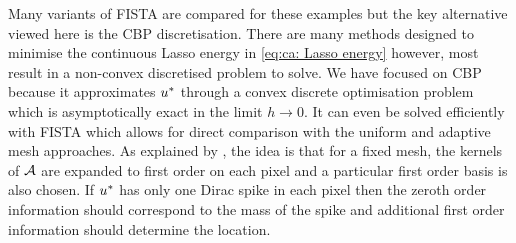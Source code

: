 \documentclass[10pt,a4paper,onecolumn]{article} \usepackage[latin1]{inputenc}
\numberwithin{equation}{section}
\newcommand*{\varf}[1]{%
	\IfEqCase{#1}{%
		{0}{u}%
		{1}{v}%
		{2}{w}%
	}[u#1]%
}
\newcommand{\meshsize}{h}
\begin{document}
Many variants of FISTA are compared for these examples but the key alternative viewed here is the CBP discretisation. There are many methods designed to minimise the continuous Lasso energy in \eqref{eq:ca: Lasso energy} \cite{Bredies2013,Castro2016,Boyd2017,Catala2019} however, most result in a non-convex discretised problem to solve. We have focused on CBP because it approximates $\varf0^*$ through a convex discrete optimisation problem which is asymptotically exact in the limit $\meshsize\to0$. It can even be solved efficiently with FISTA which allows for direct comparison with the uniform and adaptive mesh approaches. As explained by \cite{Ekanadham2011, Duval2017b}, the idea is that for a fixed mesh, the kernels of $\mathcal{A}$ are expanded to first order on each pixel and a particular first order basis is also chosen. If $\varf0^*$ has only one Dirac spike in each pixel then the zeroth order information should correspond to the mass of the spike and additional first order information should determine the location.
\end{document}
